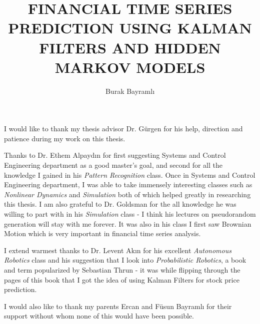 

\title{FINANCIAL TIME SERIES PREDICTION USING KALMAN FILTERS AND HIDDEN MARKOV MODELS}


\author{Burak Bayramlı}









\makemstitle        %

\makeapprovalpage

\begin{acknowledgements}
I would like to thank my thesis advisor Dr. Gürgen for his help, direction and
patience during my work on this thesis. 

Thanks to Dr. Ethem Alpaydın for first suggesting Systems and Control
Engineering department as a good master's goal, and second for all the knowledge
I gained in his {\em Pattern Recognition} class. Once in Systems and Control
Engineering department, I was able to take immensely interesting classes such as
{\em Nonlinear Dynamics} and {\em Simulation} both of which helped greatly in
researching this thesis. I am also grateful to Dr. Goldsman for the all
knowledge he was willing to part with in his {\em Simulation} class - I think
his lectures on pseudorandom generation will stay with me forever. It was also
in his class I first saw Brownian Motion which is very important in financial
time series analysis.

I extend warmest thanks to Dr. Levent Akın for his excellent {\em Autonomous
Robotics} class and his suggestion that I look into {\em Probabilistic
Robotics}, a book and term popularized by Sebastian Thrun - it was while
flipping through the pages of this book that I got the idea of using Kalman
Filters for stock price prediction.

I would also like to thank my parents Ercan and Füsun Bayramlı for their support
without whom none of this would have been possible.
\end{acknowledgements}


